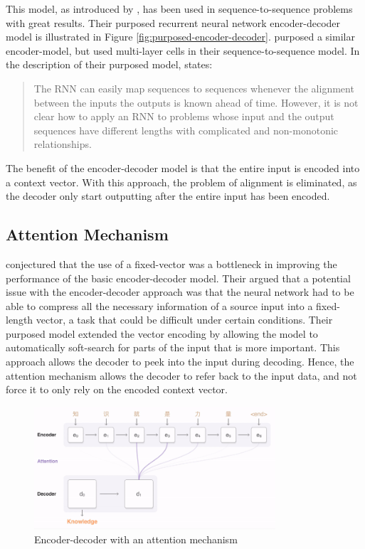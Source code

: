 This model, as introduced by \citep{cho2014learning}, has been used in sequence-to-sequence problems with great results. Their purposed recurrent neural network encoder-decoder model is illustrated in Figure \ref{fig:purposed-encoder-decoder}. \citep{sutskever2014sequence} purposed a similar encoder-model, but used multi-layer cells in their sequence-to-sequence model. In the description of their purposed model, \citep{sutskever2014sequence} states:

\begin{quote}
    The RNN can easily map sequences to sequences whenever the alignment between the inputs the outputs is known ahead of time. However, it is not clear how to apply an RNN to problems whose input and the output sequences have different lengths with complicated and non-monotonic relationships.
\end{quote}

The benefit of the encoder-decoder model is that the entire input is encoded into a context vector. With this approach, the problem of alignment is eliminated, as the decoder only start outputting after the entire input has been encoded.

\subsection{Attention Mechanism}
\label{sec:attention_mechanism}
\citep{bahdanau2014neural} conjectured that the use of a fixed-vector was a bottleneck in improving the performance of the basic encoder-decoder model. Their argued that a potential issue with the encoder-decoder approach was that the neural network had to be able to compress all the necessary information of a source input into a fixed-length vector, a task that could be difficult under certain conditions. Their purposed model extended the vector encoding by allowing the model to automatically soft-search for parts of the input that is more important. This approach allows the decoder to peek into the input during decoding. Hence, the attention mechanism allows the decoder to refer back to the input data, and not force it to only rely on the encoded context vector. 

\begin{figure}[ht]
    \centering
    \includegraphics[width=0.8\textwidth]{fig/background_theory/attention_chinese.png}
    \caption{Encoder-decoder with an attention mechanism}
    \label{fig:encoder-decoder-attention-google}
\end{figure}

